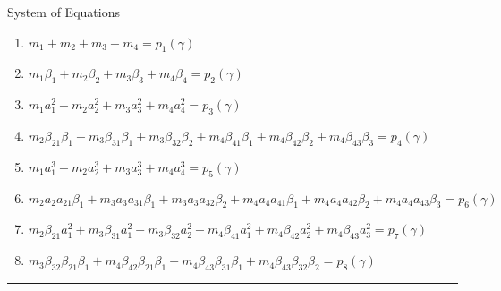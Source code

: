 \documentclass[serif]{beamer}
\begin{document}
\begin{frame}{System of Equations}
  \begin{footnotesize}
  \begin{enumerate}
   \item<1-> $m_1 + m_2 + m_3 + m_4 = p_1\left(\gamma\right)$
   \item<1-> $m_1\beta_1 + m_2\beta_2 + m_3\beta_3 + m_4\beta_4 = p_2\left(\gamma\right)$
   \item<1-> $m_1a^2_1 + m_2a^2_2 + m_3a^2_3 + m_4a^2_4 = p_3\left(\gamma\right)$
   \item<1-> $m_2\beta_{21}\beta_1 + m_3\beta_{31}\beta_1 + m_3\beta_{32}\beta_2 + m_4\beta_{41}\beta_1 + m_4\beta_{42}\beta_2 + m_4\beta_{43}\beta_3 = p_4\left(\gamma\right)$
   \item<1-> $m_1a^3_1 + m_2a^3_2 + m_3a^3_3 + m_4a^3_4 = p_5\left(\gamma\right)$
   \item<1-> $m_2a_2a_{21}\beta_1 + m_3a_3a_{31}\beta_1 + m_3a_3a_{32}\beta_2 + m_4a_4a_{41}\beta_1 + m_4a_4a_{42}\beta_2 + m_4a_4a_{43}\beta_3 = p_6\left(\gamma\right)$
   \item<1-> $m_2\beta_{21}a_1^2 + m_3\beta_{31}a_1^2 + m_3\beta_{32}a_2^2 + m_4\beta_{41}a_1^2 + m_4\beta_{42}a_2^2 + m_4\beta_{43}a_3^2 = p_7\left(\gamma\right)$
   \item<1-> $m_3\beta_{32}\beta_{21}\beta_1 + m_4\beta_{42}\beta_{21}\beta_1 + m_4\beta_{43}\beta_{31}\beta_1 + m_4\beta_{43}\beta_{32}\beta_2 = p_8\left(\gamma\right)$
  \end{enumerate}
  \end{footnotesize}
  \hrule {}
\end{frame}
\end{document}
